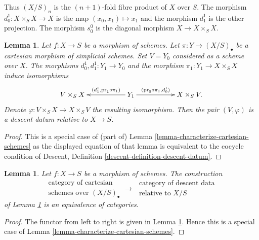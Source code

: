 \documentclass{stacks-project}
\theoremstyle{plain}
\newtheorem{lemma}[subsection]{Lemma}
\theoremstyle{definition}
\theoremstyle{remark}
\numberwithin{equation}{subsection}
\begin{document}
\noindent
Thus $(X/S)_n$ is the $(n + 1)$-fold fibre product of $X$ over $S$.
The morphism $d^1_0 : X \times_S X \to X$ is the map
$(x_0, x_1) \mapsto x_1$ and the morphism $d^1_1$ is the other
projection. The morphism $s^0_0$ is the diagonal morphism
$X \to X \times_S X$.

\begin{lemma}
\label{lemma-cartesian-over}
Let $f : X \to S$ be a morphism of schemes.
Let $\pi : Y \to (X/S)_\bullet$ be a cartesian morphism
of simplicial schemes.
Set $V = Y_0$ considered as a scheme over $X$.
The morphisms $d^1_0, d^1_1 : Y_1 \to Y_0$ and the morphism
$\pi_1 : Y_1 \to X \times_S X$ induce isomorphisms
$$
\xymatrix{
V \times_S X & &
Y_1 \ar[ll]_-{(d^1_1, \text{pr}_1 \circ \pi_1)}
\ar[rr]^-{(\text{pr}_0 \circ \pi_1, d^1_0)} & &
X \times_S V.
}
$$
Denote $\varphi : V \times_S X \to X \times_S V$ the
resulting isomorphism.
Then the pair $(V, \varphi)$ is a descent datum relative
to $X \to S$.
\end{lemma}

\begin{proof}
This is a special case of (part of)
Lemma \ref{lemma-characterize-cartesian-schemes}
as the displayed equation of that lemma is
equivalent to the cocycle condition of
Descent, Definition \ref{descent-definition-descent-datum}.
\end{proof}

\begin{lemma}
\label{lemma-cartesian-equivalent-descent-datum}
Let $f : X \to S$ be a morphism of schemes. The construction
$$
\begin{matrix}
\text{category of cartesian } \\
\text{schemes over } (X/S)_\bullet
\end{matrix}
\longrightarrow
\begin{matrix}
\text{ category of descent data} \\
\text{ relative to } X/S
\end{matrix}
$$
of Lemma \ref{lemma-cartesian-over}
is an equivalence of categories.
\end{lemma}

\begin{proof}
The functor from left to right is given in
Lemma \ref{lemma-cartesian-over}.
Hence this is a special case of
Lemma \ref{lemma-characterize-cartesian-schemes}.
\end{proof}
\end{document}
